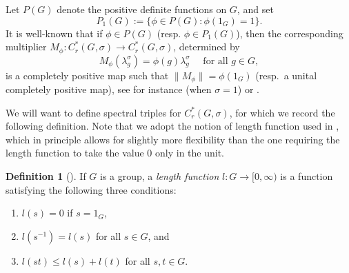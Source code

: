 \documentclass[11pt, a4paper, oneside, final, reqno]{amsart}
\newcommand{\Cred}{C^*_r}
\theoremstyle{definition}
\newtheorem{definition}{Definition}[section]
\theoremstyle{plain}
\theoremstyle{remark}
\numberwithin{equation}{section}
\begin{document}
Let $P(G)$ denote the positive definite functions on $G$, and set
\begin{equation}
    P_1(G) := \{ \phi \in P(G) : \phi(1_G) = 1 \}.
\end{equation}
It is well-known that if $\phi \in P(G)$ (resp. $\phi \in P_1(G)$), then the corresponding multiplier $ M_\phi \colon \Cred (G, \sigma) \to \Cred(G, \sigma)$, determined by
\begin{equation*}
    M_\phi(\lambda^\sigma_g) = \phi(g)\lambda^\sigma_g \quad \text{ for all } g\in G,
\end{equation*}
is a completely positive map such that $\|M_\phi\| = \phi(1_G)$ (resp.~a unital completely positive map), see for instance \cite[Theorem 2.5.11]{BO} (when $\sigma=1$) or \cite[Lemma 2.6]{BedosConti2016}.

We will want to define spectral triples for $C^*_r(G,\sigma)$, for which we record the following definition.
Note that we adopt the notion of length function used in \cite{Connes1989}, which in principle allows for slightly more flexibility than the one requiring the length function to take the value $0$ only in the unit. 
\begin{definition}[\cite{Connes1989}]
    If $G$ is a group, a \emph{length function} $l \colon G \to [0, \infty)$ is a function satisfying the following three conditions:
    \begin{enumerate}
        \item $l(s) = 0$ if $s = 1_G$,
        \item $l(s^{-1}) = l(s)$ for all $s \in G$, and
        \item $l(st) \leq l(s) + l(t)$ for all $s,t \in G$.
    \end{enumerate}
\end{definition}
\end{document}
